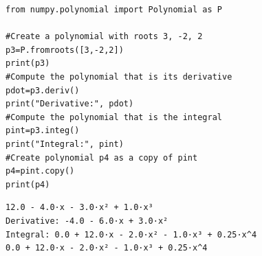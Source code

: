 \begin{verbatim}
from numpy.polynomial import Polynomial as P

#Create a polynomial with roots 3, -2, 2
p3=P.fromroots([3,-2,2])
print(p3)
#Compute the polynomial that is its derivative
pdot=p3.deriv()
print("Derivative:", pdot)
#Compute the polynomial that is the integral
pint=p3.integ()
print("Integral:", pint)
#Create polynomial p4 as a copy of pint
p4=pint.copy()
print(p4)
\end{verbatim}

\begin{verbatim}
12.0 - 4.0·x - 3.0·x² + 1.0·x³
Derivative: -4.0 - 6.0·x + 3.0·x²
Integral: 0.0 + 12.0·x - 2.0·x² - 1.0·x³ + 0.25·x^4
0.0 + 12.0·x - 2.0·x² - 1.0·x³ + 0.25·x^4
\end{verbatim}

